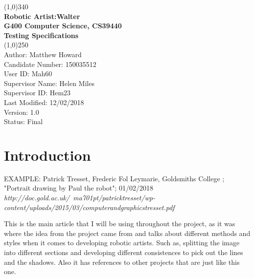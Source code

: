 \documentclass{article}
\begin{document}

    \begin{titlepage}

        \begin{center}

        \line(1,0){340}\\ 


        \large{\bfseries Robotic Artist:Walter} \\

        \large {\bfseries G400 Computer Science, CS39440 }\\
        
        \large {\bfseries Testing Specifications}\\


         \line(1,0){250}\\

         \textsf {Author: Matthew Howard \\
          Candidate Number: 150035512\\
          User ID: Mah60 \\
          Supervisor Name: Helen Miles \\
          Supervisor ID: Hem23\\
          Last Modified: 12/02/2018 \\
          Version: 1.0\\
          Status: Final} \\

        \end{center}        

    \end{titlepage}
  
    \clearpage

 	\tableofcontents
 	
 	\clearpage

    \section{Introduction}


    \begin{thebibliography}{9}


    EXAMPLE: Patrick Tresset, Frederic Fol Leymarie, Goldsmiths College ; "Portrait drawing by Paul the robot"; 01/02/2018 \\ 

    \textit{http://doc.gold.ac.uk/~ma701pt/patricktresset/wp-content/uploads/2015/03/computerandgraphicstresset.pdf}

    

This is the main article that I will be using throughout the project, as it was where the idea from the project came from and talks about different methods and styles when it comes to developing robotic artists. Such as, splitting the image into different sections and developing different consistences to pick out the lines and the shadows. Also it has references to other projects that are just like this one. 
    

    \end{thebibliography}
\end{document}
